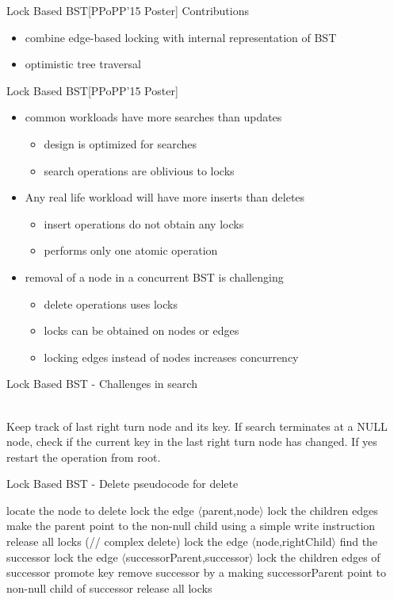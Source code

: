 \begin{frame}[c]{Lock Based BST[PPoPP'15 Poster]}
Contributions
\begin{itemize}
\item combine edge-based locking with internal representation of BST
\item optimistic tree traversal 
\end{itemize}
\end{frame}

\begin{frame}[c]{Lock Based BST[PPoPP'15 Poster]}
\begin{itemize}
\item common workloads have more searches than updates
\begin{itemize}
\item design is optimized for searches
\item search operations are oblivious to locks
\end{itemize}
\pause
\item Any real life workload will have more inserts than deletes
\begin{itemize}
\item insert operations do not obtain any locks
\item performs only one atomic operation
\end{itemize}
\pause
\item removal of a node in a concurrent BST is challenging
\begin{itemize}
\item delete operations uses locks
\item locks can be obtained on nodes or edges
\item locking edges instead of nodes increases concurrency
\end{itemize}
\end{itemize}
\end{frame}

\begin{frame}{Lock Based BST - Challenges in search}

{
\\Keep track of last right turn node and its key. If search terminates at a NULL node, check if the current key in the last right turn node has changed. If yes restart the operation from root.
}
\end{frame}

\ifdefined\LONG
\begin{frame}[c]{Lock Based BST - Delete}
pseudocode for delete
\begin{algorithm}[H]
locate the node to delete\;
{
lock the edge $\langle$parent,node$\rangle$\;
lock the children edges\;
make the parent point to the non-null child using a simple write instruction\;
release all locks\;
}
\Else(// complex delete)
{
lock the edge $\langle$node,rightChild$\rangle$\;
find the successor\;
lock the edge $\langle$successorParent,successor$\rangle$\;
lock the children edges of successor\;
promote key\;
remove successor by a making successorParent point to non-null child of successor\;
release all locks\;
}
\end{algorithm}
\end{frame}
\fi

